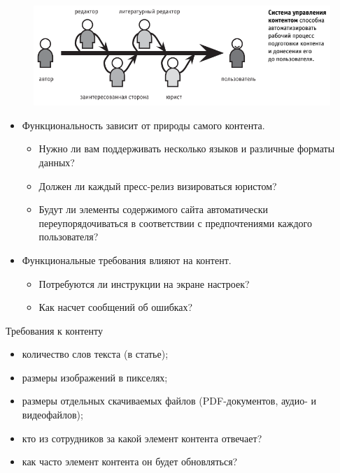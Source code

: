 \documentclass{beamer}
\begin{document}
\begin{frame}[t]
\begin{figure}[h]
\centering
\includegraphics[scale=0.5]{images/lec02-pic04.png}
\end{figure}
\begin{itemize}
\item Функциональность зависит от природы самого контента. 
	\begin{itemize}
	\item Нужно ли вам поддерживать несколько языков и различные форматы данных? 
	\item Должен ли каждый пресс-релиз визироваться юристом? 
	\item Будут ли элементы содержимого сайта автоматически переупорядочиваться в соответствии с предпочтениями каждого пользователя? 	
	\end{itemize}
\item Функциональные требования влияют на контент.
	\begin{itemize}
	\item Потребуются ли инструкции на экране настроек?
	\item Как насчет сообщений об ошибках?
	\end{itemize}
\end{itemize}
\end{frame}

\begin{frame}[t]{Требования к контенту}
\begin{itemize}
\item количество слов текста (в статье);
\item размеры изображений в пикселях;
\item размеры отдельных скачиваемых файлов (PDF-документов, аудио- и видеофайлов);
\item кто из сотрудников за какой элемент контента отвечает?
\item как часто элемент контента он будет обновляться?
\end{itemize}
\end{frame}
\end{document}
